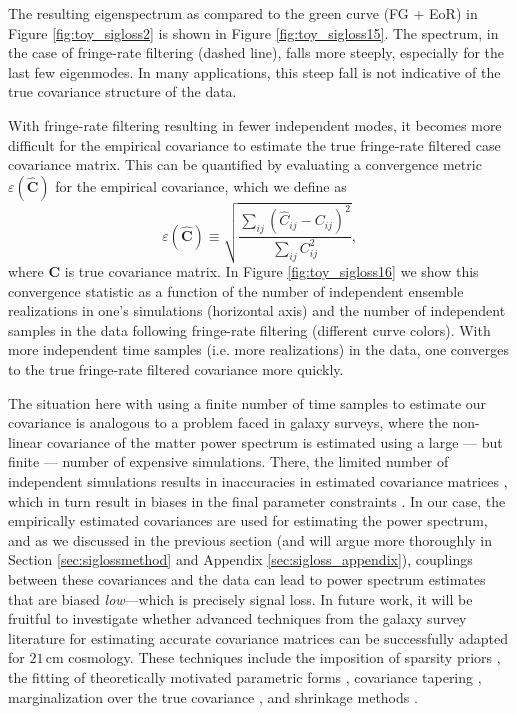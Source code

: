 \documentclass[preprint2,numberedappendix,tighten]{aastex6}  %
\newcommand{\C}{\mathbf{C}}
\newcommand{\Chat}{\mathbf{\widehat{C}}}
\begin{document}
The resulting eigenspectrum as compared to the green curve (FG + EoR) in Figure \ref{fig:toy_sigloss2} is shown in Figure 
\ref{fig:toy_sigloss15}. The spectrum, in the case of fringe-rate filtering (dashed line), falls more steeply, especially for 
the last few eigenmodes. In many applications, this steep fall is not indicative of the true covariance structure of the data.

With 
fringe-rate filtering resulting in fewer independent modes, it becomes more difficult for the empirical covariance to estimate the 
true fringe-rate filtered case covariance matrix. This can be quantified by evaluating a convergence metric $\varepsilon(\Chat)$ for the empirical covariance, which we define as
\begin{equation}
\label{eq:converge}
\varepsilon (\Chat) \equiv \sqrt{\frac{\sum_{ij} (\widehat{C}_{ij} - {C}_{ij})^2}{\sum_{ij} {C}_{ij}^2}},
\end{equation}
where $\C$ is true covariance matrix. In Figure \ref{fig:toy_sigloss16} we show this convergence statistic as a function of the number of independent ensemble realizations in one's simulations (horizontal axis) and the number of independent samples in the data following fringe-rate filtering (different curve colors). With more independent time samples (i.e. more realizations) in the data, one converges to the true fringe-rate filtered covariance more quickly. 

The situation here with using a finite number of time samples to estimate our covariance is analogous to a problem faced in galaxy surveys, where the non-linear covariance 
of the matter power spectrum is estimated using a large --- but finite --- number of expensive simulations. There, the limited 
number of independent simulations results in inaccuracies in estimated covariance matrices 
\citep{dodelson_schneider2013,taylor_joachimi_etal2014}, which in turn result in biases in the final parameter constraints 
\citep{hartlap_et_al2007}. In our case, the empirically estimated covariances are used for estimating the power spectrum, and 
as we discussed in the previous section (and will argue more thoroughly in Section \ref{sec:siglossmethod} and Appendix \ref{sec:sigloss_appendix}), couplings between these covariances and the data can lead to power spectrum estimates that are biased 
\emph{low}---which is precisely signal loss. In future work, it will be fruitful to investigate whether advanced techniques from the 
galaxy survey literature for estimating accurate covariance matrices can be successfully adapted for $21\,\textrm{cm}$ 
cosmology. These techniques include the imposition of sparsity priors \citep{padmanabhan_et_al2016}, the fitting of 
theoretically motivated parametric forms \citep{pearson_samushia2016}, covariance tapering \citep{paz_sanchez2015}, 
marginalization over the true covariance \citep{sellentin_heavens2016}, and shrinkage methods 
\citep{pope_szapudi2008,joachimi_2017}.
\end{document}
